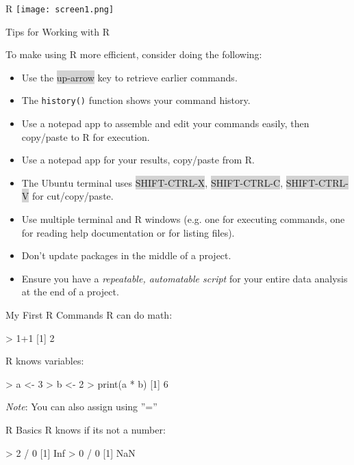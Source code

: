 \documentclass[ignorenonframetext,xcolor=x11names]{beamer}
\begin{document}
\begin{frame}{R}
\centering
\texttt{[image: screen1.png]}
\end{frame}

\begin{frame}{Tips for Working with R}

To make using R more efficient, consider doing the following:

\begin{itemize}
    \item Use the {\footnotesize\colorbox{lightgray}{up-arrow}} key to retrieve earlier commands.
    \item The \texttt{history()} function shows your command history.
    \item Use a notepad app to assemble and edit your commands easily, then copy/paste to R for execution.
    \item Use a notepad app for your results, copy/paste from R.
    \item The Ubuntu terminal uses {\footnotesize\colorbox{lightgray}{SHIFT-CTRL-X}}, {\footnotesize\colorbox{lightgray}{SHIFT-CTRL-C}}, {\footnotesize\colorbox{lightgray}{SHIFT-CTRL-V}} for cut/copy/paste.
    \item Use multiple terminal and R windows (e.g. one for executing commands, one for reading help documentation or for listing files).
    \item Don't update packages in the middle of a project.
    \item Ensure you have a \emph{repeatable, automatable script} for your entire data analysis at the end of a project.
\end{itemize}
\end{frame}


\begin{frame}[fragile]{My First R Commands}
R can do math:
\begin{Rcode}
> 1+1
[1] 2
\end{Rcode}
R knows variables:
\begin{Rcode}
> a <- 3
> b <- 2
> print(a * b)
[1] 6
\end{Rcode}
\emph{Note}: You can also assign using ''=''
\end{frame}

\begin{frame}[fragile]{R Basics}
R knows if its not a number:
\begin{Rcode}
> 2 / 0
[1] Inf
> 0 / 0
[1] NaN
\end{Rcode}
\end{frame}
\end{document}
